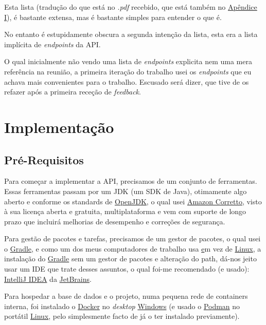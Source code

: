 Esta lista (tradução do que está no \textit{.pdf} recebido, que está também no \hyperref[ap1]{Apêndice I}), é bastante extensa, mas é bastante simples para entender o que é.

No entanto é estupidamente obscura a segunda intenção da lista, esta era a lista implícita de \textit{endpoints} da API\@.

O qual inicialmente não vendo uma lista de \textit{endpoints} explicita nem uma mera referência na reunião, a primeira iteração do trabalho usei os \textit{endpoints} que eu achava mais convenientes para o trabalho. Escusado será dizer, que tive de os refazer após a primeira receção de \textit{feedback}.

\newpage

\section{Implementação}

\subsection{Pré-Requisitos}

Para começar a implementar a API, precisamos de um conjunto de ferramentas. Essas ferramentas passam por um JDK (um SDK de Java), otimamente algo aberto e conforme os standards de \href{https://openjdk.org/}{OpenJDK}, o qual usei \href{https://docs.aws.amazon.com/corretto/latest/corretto-17-ug/downloads-list.html}{Amazon Corretto}, visto à sua licença aberta e gratuita, multiplataforma e vem com suporte de longo prazo que incluirá melhorias de desempenho e correções de segurança.

Para gestão de pacotes e tarefas, precisamos de um gestor de pacotes, o qual usei o \href{https://gradle.org/}{Gradle}, e como um dos meus computadores de trabalho usa \href{https://www.microsoft.com/pt-pt/software-download/windows10} em vez de \href{https://archlinux.org/download/}{Linux}, a instalação do \href{https://gradle.org/}{Gradle} sem um gestor de pacotes e alteração do path, dá-nos jeito usar um IDE que trate desses assuntos, o qual foi-me recomendado (e usado): \href{https://www.jetbrains.com/idea/}{IntelliJ IDEA} da \href{https://www.jetbrains.com/}{JetBrains}.

Para hospedar a base de dados e o projeto, numa pequena rede de containers interna, foi instalado o \href{https://www.docker.com/}{Docker} no \textit{desktop} \href{https://www.microsoft.com/pt-pt/software-download/windows10}{Windows} (e usado o \href{https://podman.io/}{Podman} no portátil \href{https://archlinux.org/download/}{Linux}, pelo simplesmente facto de já o ter instalado previamente).

